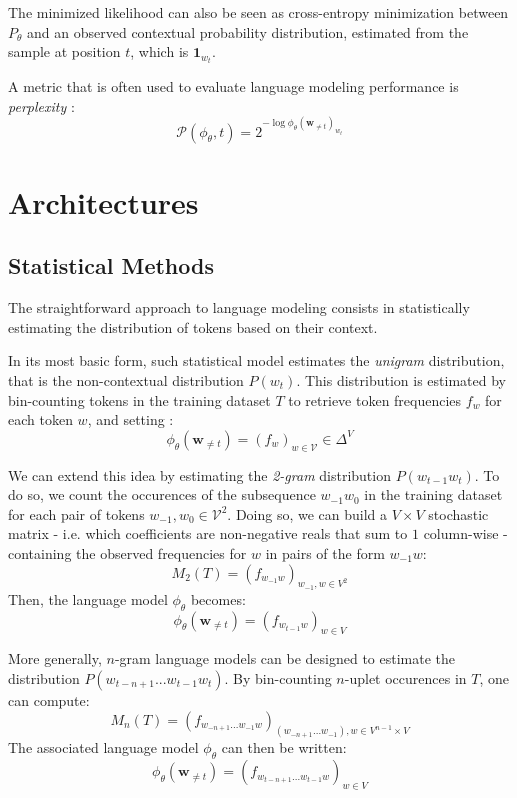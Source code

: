 The minimized likelihood can also be seen as cross-entropy minimization between $P_\theta$ and an observed contextual probability distribution, estimated from the sample at position $t$, which is $\mathbf{1}_{w_t}$.

A metric that is often used to evaluate language modeling performance is \textit{perplexity} :
$$
\mathcal{P}(\phi_\theta, t) = 2^{-\log \phi_\theta(\mathbf{w}_{\neq t})_{w_t}}
$$


\section{Architectures}

\subsection{Statistical Methods}

The straightforward approach to language modeling consists in statistically estimating the distribution of tokens based on their context. 

In its most basic form, such statistical model estimates the \textit{unigram} distribution, that is the non-contextual distribution $P(w_t)$. This distribution is estimated by bin-counting tokens in the training dataset $T$ to retrieve token frequencies $f_w$ for each token $w$, and setting :
$$
\phi_{\theta}(\mathbf{w}_{\neq t}) = (f_w)_{w \in \mathcal{V}} \in \Delta^{V}
$$

We can extend this idea by estimating the \textit{2-gram} distribution $P(w_{t-1}w_t)$. To do so, we count the occurences of the subsequence $w_{-1} w_0$ in the training dataset for each pair of tokens $w_{-1}, w_0 \in \mathcal{V}^2$. Doing so, we can build a $V \times V$ stochastic matrix - i.e. which coefficients are non-negative reals that sum to $1$ column-wise - containing the observed frequencies for $w$ in pairs of the form $w_{-1} w$:
$$
M_2(T) = (f_{w_{-1} w})_{w_{-1}, w \in V^2}
$$
Then, the language model $\phi_{\theta}$ becomes:
$$
\phi_{\theta}(\mathbf{w}_{\neq t}) = (f_{w_{t-1} w})_{w \in V}
$$

More generally, $n$-gram language models \citep{jurafsky_course} can be designed to estimate the distribution $P(w_{t-n +1}...w_{t-1}w_t)$. By bin-counting $n$-uplet occurences in $T$, one can compute:
$$
M_n(T) = (f_{w_{-n+1}...w_{-1}w})_{(w_{-n+1}...w_{-1}), w \in V^{n-1} \times V}
$$
The associated language model $\phi_{\theta}$ can then be written:
$$
\phi_{\theta}(\mathbf{w}_{\neq t}) = (f_{w_{t-n+1}...w_{t-1} w})_{w \in V}
$$

